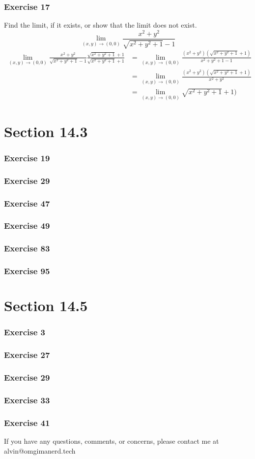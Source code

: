 \documentclass[letterpaper, 12pt]{math}
\begin{document}
\subsubsection*{Exercise 17}
Find the limit, if it exists, or show that the limit does not exist.
\[ \lim_{(x,y)\to(0,0)}\frac{x^2+y^2}{\sqrt{x^2+y^2+1}-1} \]
\begin{align*}
  \lim_{(x,y)\to(0,0)}\frac{x^2+y^2}{\sqrt{x^2+y^2+1}-1}
    \frac{\sqrt{x^2+y^2+1}+1}{\sqrt{x^2+y^2+1}+1} &=
    \lim_{(x,y)\to(0,0)}\frac{(x^2+y^2)(\sqrt{x^2+y^2+1}+1)}{x^2+y^2+1-1} \\
  &= \lim_{(x,y)\to(0,0)}\frac{(x^2+y^2)(\sqrt{x^2+y^2+1}+1)}{x^2+y^2} \\
  &= \lim_{(x,y)\to(0,0)}\sqrt{x^2+y^2+1}+1)
\end{align*}

\section*{Section 14.3}

\subsubsection*{Exercise 19}
\subsubsection*{Exercise 29}
\subsubsection*{Exercise 47}
\subsubsection*{Exercise 49}
\subsubsection*{Exercise 83}
\subsubsection*{Exercise 95}

\section*{Section 14.5}

\subsubsection*{Exercise 3}
\subsubsection*{Exercise 27}
\subsubsection*{Exercise 29}
\subsubsection*{Exercise 33}
\subsubsection*{Exercise 41}

\begin{center}
  If you have any questions, comments, or concerns, please contact me at
  alvin@omgimanerd.tech
\end{center}
\end{document}
